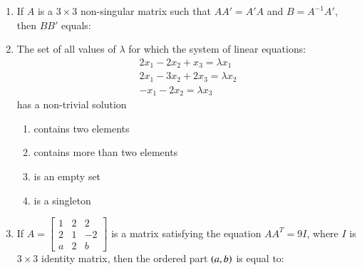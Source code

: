 \documentclass[journal,12pt,twocolumn]{IEEEtran}
\theoremstyle{remark}
\begin{document}
\begin{enumerate}
	\item If $A$ is a $3\times3$ non-singular matrix such that $AA'=A'A$ and $B=A^{-1}A'$, then $BB'$ equals:%
	\newline
	\hfill{}
        \begin{enumerate}[label={(\alph*)}]
        \end{enumerate}


    \item The set of all values of $\lambda$ for which the system of linear equations:
	\begin{align*}
		2x_1-2x_2+x_3 = \lambda x_1\\
		2x_1-3x_2+2x_3 = \lambda x_2\\
		-x_1-2x_2= \lambda x_3
	\end{align*}
	has a non-trivial solution

	\hfill{}
	\begin{enumerate}[label={(\alph*)}]
		\item contains two elements
		\item contains more than two elements
		\item is an empty set
		\item is a singleton
	\end{enumerate}


	\item If $A = \begin{bmatrix}1&2&2\\2&1&-2\\a&2&b\end{bmatrix}$ is a matrix satisfying the equation $AA^T = 9I$, where $I$ is $3\times3$ identity matrix, then the ordered part $\left(a,b\right)$ is equal to:
	\hfill{}
	\begin{enumerate}[label={(\alph*)}]


\end{enumerate}
\end{enumerate}
\end{document}
